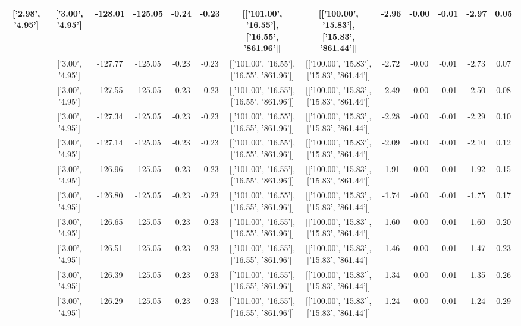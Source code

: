 \begin{table}[htbp]
\begin{adjustbox}{angle=90}
\begin{tabular}{|c|c|c|c|c|c|c|c|c|c|c|c|c|}
 ['2.98', '4.95'] & ['3.00', '4.95'] & -128.01 & -125.05 & -0.24 & -0.23 & [['101.00', '16.55'], ['16.55', '861.96']] & [['100.00', '15.83'], ['15.83', '861.44']] & -2.96 & -0.00 & -0.01 & -2.97 & 0.05\\ \hline
 ['2.98', '4.95'] & ['3.00', '4.95'] & -127.77 & -125.05 & -0.23 & -0.23 & [['101.00', '16.55'], ['16.55', '861.96']] & [['100.00', '15.83'], ['15.83', '861.44']] & -2.72 & -0.00 & -0.01 & -2.73 & 0.07\\ \hline
 ['2.98', '4.95'] & ['3.00', '4.95'] & -127.55 & -125.05 & -0.23 & -0.23 & [['101.00', '16.55'], ['16.55', '861.96']] & [['100.00', '15.83'], ['15.83', '861.44']] & -2.49 & -0.00 & -0.01 & -2.50 & 0.08\\ \hline
 ['2.98', '4.95'] & ['3.00', '4.95'] & -127.34 & -125.05 & -0.23 & -0.23 & [['101.00', '16.55'], ['16.55', '861.96']] & [['100.00', '15.83'], ['15.83', '861.44']] & -2.28 & -0.00 & -0.01 & -2.29 & 0.10\\ \hline
 ['2.98', '4.95'] & ['3.00', '4.95'] & -127.14 & -125.05 & -0.23 & -0.23 & [['101.00', '16.55'], ['16.55', '861.96']] & [['100.00', '15.83'], ['15.83', '861.44']] & -2.09 & -0.00 & -0.01 & -2.10 & 0.12\\ \hline
 ['2.99', '4.95'] & ['3.00', '4.95'] & -126.96 & -125.05 & -0.23 & -0.23 & [['101.00', '16.55'], ['16.55', '861.96']] & [['100.00', '15.83'], ['15.83', '861.44']] & -1.91 & -0.00 & -0.01 & -1.92 & 0.15\\ \hline
 ['2.99', '4.95'] & ['3.00', '4.95'] & -126.80 & -125.05 & -0.23 & -0.23 & [['101.00', '16.55'], ['16.55', '861.96']] & [['100.00', '15.83'], ['15.83', '861.44']] & -1.74 & -0.00 & -0.01 & -1.75 & 0.17\\ \hline
 ['2.99', '4.95'] & ['3.00', '4.95'] & -126.65 & -125.05 & -0.23 & -0.23 & [['101.00', '16.55'], ['16.55', '861.96']] & [['100.00', '15.83'], ['15.83', '861.44']] & -1.60 & -0.00 & -0.01 & -1.60 & 0.20\\ \hline
 ['2.99', '4.95'] & ['3.00', '4.95'] & -126.51 & -125.05 & -0.23 & -0.23 & [['101.00', '16.55'], ['16.55', '861.96']] & [['100.00', '15.83'], ['15.83', '861.44']] & -1.46 & -0.00 & -0.01 & -1.47 & 0.23\\ \hline
 ['2.99', '4.95'] & ['3.00', '4.95'] & -126.39 & -125.05 & -0.23 & -0.23 & [['101.00', '16.55'], ['16.55', '861.96']] & [['100.00', '15.83'], ['15.83', '861.44']] & -1.34 & -0.00 & -0.01 & -1.35 & 0.26\\ \hline
 ['2.99', '4.95'] & ['3.00', '4.95'] & -126.29 & -125.05 & -0.23 & -0.23 & [['101.00', '16.55'], ['16.55', '861.96']] & [['100.00', '15.83'], ['15.83', '861.44']] & -1.24 & -0.00 & -0.01 & -1.24 & 0.29\\ \hline

\end{tabular}
\end{adjustbox}
\end{table}
